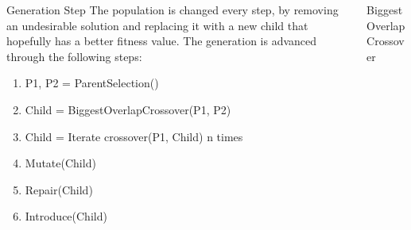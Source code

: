 \documentclass[ %
                    author={Callum Mann},
                     title={Genetic algorithms for the CVRP},
                  subtitle={Capacitated Vehicle Routing Problem},
                      type={Heuristics},
                      year={2016}]{poster}
\begin{document}
\begin{frame}{}
\begin{columns}[t]
  \begin{column}{0.422\linewidth}
  \begin{block}{\Large Generation Step}
  The population is changed every step, by removing an undesirable solution and 
  replacing it with a new child that hopefully has a better fitness value. The generation
  is advanced through the following steps:
  \begin{enumerate}
    \item P1, P2 = ParentSelection()
    \item Child = BiggestOverlapCrossover(P1, P2)
    \item Child = Iterate crossover(P1, Child) n times
    \item Mutate(Child)
    \item Repair(Child)
    \item Introduce(Child)
  \end{enumerate}
  \end{block}
  \end{column}
  \begin{column}{0.422\linewidth}
  \begin{block}{\Large Biggest Overlap Crossover}
    \vspace{10cm}
  \end{block}
  \end{column}
\end{columns}

\vfill

\end{frame}

\end{document}
